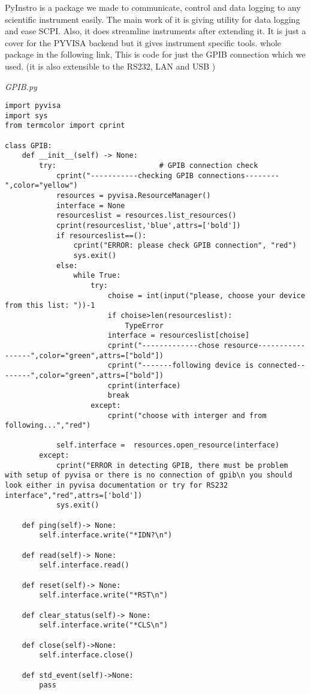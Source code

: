 
PyInstro is a package we made to communicate, control and data logging to any scientific instrument easily. The main work of it is giving utility for data logging and ease SCPI. Also, it does streamline instruments after extending it. It is just a cover for the PYVISA backend but it gives instrument specific tools. whole package in the following link,
This is code for just the GPIB connection which we used. (it is also extensible to the RS232, LAN and USB )

\emph{GPIB.py}
\begin{verbatim}
import pyvisa
import sys
from termcolor import cprint

class GPIB:
    def __init__(self) -> None:                                 
        try:                        # GPIB connection check
            cprint("-----------checking GPIB connections--------",color="yellow")
            resources = pyvisa.ResourceManager()
            interface = None
            resourceslist = resources.list_resources()
            cprint(resourceslist,'blue',attrs=['bold'])
            if resourceslist==():
                cprint("ERROR: please check GPIB connection", "red")
                sys.exit()
            else:
                while True:
                    try:
                        choise = int(input("please, choose your device from this list: "))-1
                        if choise>len(resourceslist):
                            TypeError
                        interface = resourceslist[choise]
                        cprint("-------------chose resource-----------------",color="green",attrs=["bold"])
                        cprint("-------following device is connected--------",color="green",attrs=["bold"])
                        cprint(interface)
                        break
                    except:
                        cprint("choose with interger and from following...","red")

            self.interface =  resources.open_resource(interface)
        except:
            cprint("ERROR in detecting GPIB, there must be problem with setup of pyvisa or there is no connection of gpib\n you should look either in pyvisa documentation or try for RS232 interface","red",attrs=['bold'])
            sys.exit()

    def ping(self)-> None:
        self.interface.write("*IDN?\n")

    def read(self)-> None:
        self.interface.read()

    def reset(self)-> None:
        self.interface.write("*RST\n")

    def clear_status(self)-> None:
        self.interface.write("*CLS\n")

    def close(self)->None:
        self.interface.close()

    def std_event(self)->None:
        pass

\end{verbatim}

